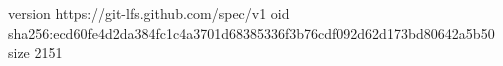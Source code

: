 version https://git-lfs.github.com/spec/v1
oid sha256:ecd60fe4d2da384fc1c4a3701d68385336f3b76cdf092d62d173bd80642a5b50
size 2151

